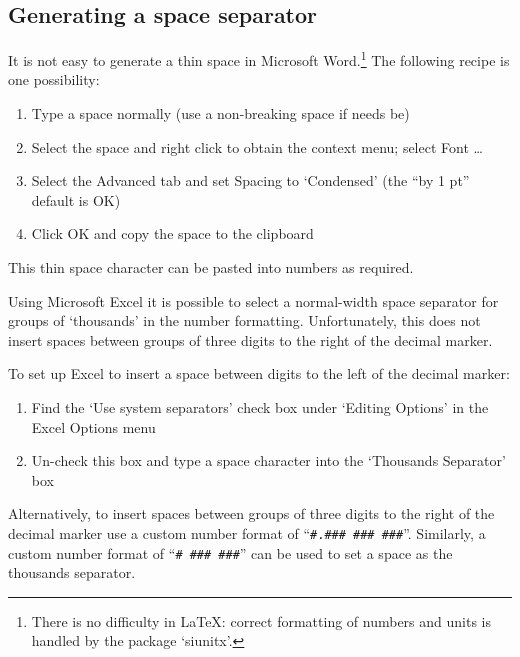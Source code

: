\subsection{Generating a space separator}
It is not easy to generate a thin space in Microsoft Word.\footnote{There is no difficulty in \LaTeX: correct formatting of numbers and units is handled by the package `siunitx'.} The following recipe is one possibility:
\begin{enumerate}
\item Type a space normally (use a non-breaking space if needs be) 
\item Select the space and right click to obtain the context menu; select Font …
\item Select the Advanced tab and set Spacing to `Condensed' (the ``by 1 pt'' default is OK)
\item Click OK and copy the space to the clipboard 
\end{enumerate}

This thin space character can be pasted into numbers as required.

Using Microsoft Excel it is possible to select a normal-width space separator for groups of `thousands'  in the number formatting. Unfortunately, this does not insert spaces between groups of three digits to the right of the decimal marker. 

To set up Excel to insert a space between digits to the left of the decimal marker:
\begin{enumerate}
\item Find the `Use system separators' check box under `Editing Options' in the Excel Options menu 
\item Un-check this box and type a space character into the `Thousands Separator' box
\end{enumerate} 

Alternatively, to insert spaces between groups of three digits to the right of the decimal marker use a custom number format of ``\verb|#.### ### ###|''. Similarly, a custom number format of ``\verb|# ### ###|'' can be used to set a space as the thousands separator.

